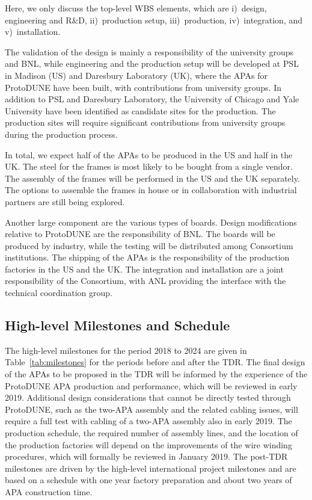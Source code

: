 Here, we only discuss the top-level WBS elements, which are i)~design, engineering and R\&D, ii)~production setup, iii)~production, iv)~integration, and v)~installation.

The validation of the design is mainly a responsibility of the university groups and BNL, while engineering and the production setup will be developed at PSL in Madison (US) and Daresbury Laboratory (UK), where the APAs for ProtoDUNE have been built, with contributions from university groups. In addition to PSL and Daresbury Laboratory, the University of Chicago and Yale University have been identified as candidate sites for the production. The production sites will require significant contributions from university groups during the production process. 

In total, we expect half of the APAs to be produced in the US and half in the UK. The steel for the frames is most likely to be bought from a single vendor. The assembly of the frames will be performed in the US and the UK separately. The options to assemble the frames in house or in collaboration with industrial partners are still being explored. 

Another large component are the various types of boards. Design modifications relative to ProtoDUNE are the responsibility of BNL. The boards will be produced by industry, while the testing will be distributed among Consortium institutions. The shipping of the APAs is the responsibility of the production factories in the US and the UK.  The integration and installation are a joint responsibility of the Consortium, with ANL providing the interface with the technical coordination group.


\subsection{High-level Milestones and Schedule}
\label{sec:fdsp-apa-org-cs}

The high-level milestones for the period 2018 to 2024 are given in Table~\ref{tab:milestones} for the periods before and after the TDR. The final design of the APAs to be proposed in the TDR will be informed by the experience of the ProtoDUNE APA production and performance, which will be reviewed in early 2019. Additional design considerations that cannot be directly tested through ProtoDUNE, such as the two-APA assembly and the related cabling issues, will require a full test with cabling of a two-APA assembly also in early 2019. The production schedule, the required number of assembly lines, and the location of the production factories will depend on the improvements of the wire winding procedures, which will formally be reviewed in January 2019. The post-TDR milestones are driven by the high-level international project milestones and are based on a schedule with one year factory preparation and about two years of APA construction time.

